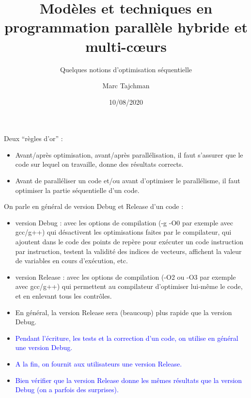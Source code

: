 \documentclass{beamer}
\title{Modèles et techniques en programmation parallèle hybride et multi-c\oe urs}
\subtitle{Quelques notions d'optimisation séquentielle}
\author{Marc Tajchman}\institute{CEA - DEN/DM2S/STMF/LMES}
\date{10/08/2020}
\begin{document}
\begin{frame}
\titlepage
\end{frame}

\large
\begin{frame}
	Deux ``règles d'or'' :
		\bigskip

	\begin{itemize}
		\item Avant/après optimisation, avant/après parallélisation, il faut s'assurer que le code sur lequel on travaille, donne des résultats corrects.
		\bigskip
		
		\item Avant de paralléliser un code et/ou avant d'optimiser le parallélisme, il faut optimiser la partie séquentielle d'un code.
	\end{itemize}

\end{frame}

\begin{frame}

On parle en général de version Debug et Release d'un code :
{\small
\begin{itemize}
	\item version Debug : avec les options de compilation (-g -O0 par exemple avec gcc/g++) qui désactivent les optimisations faites par le compilateur, qui ajoutent dans le code des points de repère pour exécuter un code instruction par instruction, testent la validité des indices de vecteurs, affichent la valeur de variables en cours d'exécution, etc.
	
	\item version Release : avec les options de compilation (-O2 ou -O3 par exemple avec gcc/g++) qui permettent au compilateur d'optimiser lui-même le code, et en enlevant tous les contrôles.
	
	\item En général, la version Release sera (beaucoup) plus rapide que la version Debug.
\end{itemize}
}
\vfill

\begin{itemize}
	\item[\textbullet] \textcolor{blue}{
		Pendant l'écriture, les tests et la correction d'un code, on utilise en général une version Debug. }
	\item[\textbullet] \textcolor{blue}{
		A la fin, on fournit aux utilisateurs une version Release.}
	\item[\textbullet] \textcolor{blue}{
		Bien vérifier que la version Release donne les mêmes résultats que la version Debug (on a parfois des surprises).}
\end{itemize}

\end{frame}
\end{document}
